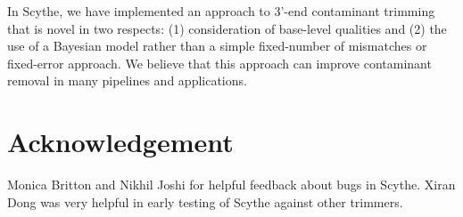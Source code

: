 \documentclass{bioinfo}
\begin{document}
In Scythe, we have implemented an approach to 3'-end contaminant
trimming that is novel in two respects: (1) consideration of
base-level qualities and (2) the use of a Bayesian model rather than a
simple fixed-number of mismatches or fixed-error approach. We believe
that this approach can improve contaminant removal in many pipelines
and applications.


\section*{Acknowledgement}
Monica Britton and Nikhil Joshi for helpful feedback about bugs in
Scythe. Xiran Dong was very helpful in early testing of Scythe against
other trimmers.




% 
% 
% 
% 
\nocite{qrqc}
\nocite{ShortRead}
\nocite{Biostrings}
\nocite{ggplot2}


\end{document}

